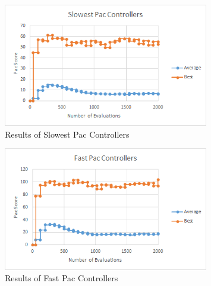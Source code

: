 \documentclass{article}
\begin{document}
\begin{flushleft}
\begin{figure}[h]
	\centering
	\includegraphics[width=0.8\textwidth]{speedSlowest}
	\caption{Results of Slowest Pac Controllers}
\end{figure}

\clearpage

\begin{figure}[h]
	\centering
	\includegraphics[width=0.8\textwidth]{speedFast}
	\caption{Results of Fast Pac Controllers}
\end{figure}
\end{flushleft}
\end{document}
